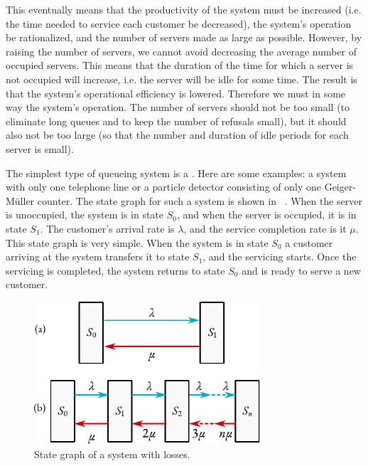 This eventually means that the productivity of the system must be increased (i.e. the time needed to service each customer be decreased), the system's
operation be rationalized, and the number of servers made as large as
possible. However, by raising the number of servers, we cannot avoid
decreasing the average number of occupied servers. This means that the
duration of the time for which a server is not occupied will increase,
i.e. the server will be idle for some time. The result is that the
system's operational efficiency is lowered. Therefore we must in some
way  the system's operation. The number of servers should not
be too small (to eliminate long queues and to keep the number of
refusals small), but it should also not be too large (so that the
number and duration of idle periods for each server is small).

 The simplest type of queueing system is
a . Here are some examples: a system with only one telephone line or a particle detector consisting of only one
Geiger-M\"uller counter. The state graph for such a system is shown in ~. When the server is unoccupied, the system is in state $S_{0}$, and when the server is occupied, it is in state $S_{1}$. The customer’s arrival rate is $\lambda$, and the service completion rate is it $\mu$. This state graph is very simple. When the system is in state $S_{0}$ a customer arriving at the system transfers it to state $S_{1}$, and the servicing starts. Once the servicing is completed, the system returns to state $S_{0}$ and is ready to serve a new customer.
 \begin{figure}[!h]
 \centering
 \includegraphics[width=0.75\textwidth]{figures/state-graph3.pdf}
\caption{State graph of a system with losses.\label{state-graph3}}
 \end{figure}

